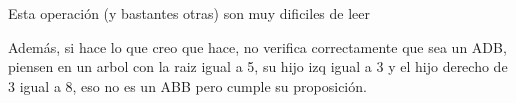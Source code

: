 
\begin{DoxyRefList}
\item[\label{deprecated__deprecated000001}%
\hypertarget{deprecated__deprecated000001}{}%
Página \hyperlink{axiomas}{Axiomas y proposiciones auxiliares} ]Esta operación (y bastantes otras) son muy dificiles de leer 

Además, si hace lo que creo que hace, no verifica correctamente que sea un A\+DB, piensen en un arbol con la raiz igual a 5, su hijo izq igual a 3 y el hijo derecho de 3 igual a 8, eso no es un A\+BB pero cumple su proposición.
\end{DoxyRefList}
